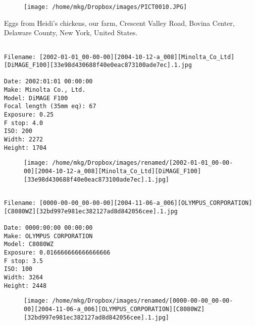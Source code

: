 \begin{figure}
\texttt{[image: /home/mkg/Dropbox/images/PICT0010.JPG]}
\end{figure}
    
\clearpage
\onecolumn
\noindent Eggs from Heidi's chickens, our farm, Crescent Valley Road, Bovina Center, Delaware County, New York, United States.
\noindent
\begin{lstlisting}

Filename: [2002-01-01_00-00-00][2004-10-12-a_008][Minolta_Co_Ltd][DiMAGE_F100][33e98d430688f40e0eac873100ade7ec].1.jpg

Date: 2002:01:01 00:00:00
Make: Minolta Co., Ltd.
Model: DiMAGE F100
Focal length (35mm eq): 67
Exposure: 0.25
F stop: 4.0
ISO: 200
Width: 2272
Height: 1704
\end{lstlisting}
\clearpage

\begin{figure}
\texttt{[image: /home/mkg/Dropbox/images/renamed/[2002-01-01\_00-00-00][2004-10-12-a\_008][Minolta\_Co\_Ltd][DiMAGE\_F100][33e98d430688f40e0eac873100ade7ec].1.jpg]}
\end{figure}
    
\clearpage
\onecolumn
\noindent 
\noindent
\begin{lstlisting}

Filename: [0000-00-00_00-00-00][2004-11-06-a_006][OLYMPUS_CORPORATION][C8080WZ][32bd997e981ec382127ad8d842056cee].1.jpg

Date: 0000:00:00 00:00:00
Make: OLYMPUS CORPORATION
Model: C8080WZ
Exposure: 0.016666666666666666
F stop: 3.5
ISO: 100
Width: 3264
Height: 2448
\end{lstlisting}
\clearpage

\begin{figure}
\texttt{[image: /home/mkg/Dropbox/images/renamed/[0000-00-00\_00-00-00][2004-11-06-a\_006][OLYMPUS\_CORPORATION][C8080WZ][32bd997e981ec382127ad8d842056cee].1.jpg]}
\end{figure}
    
